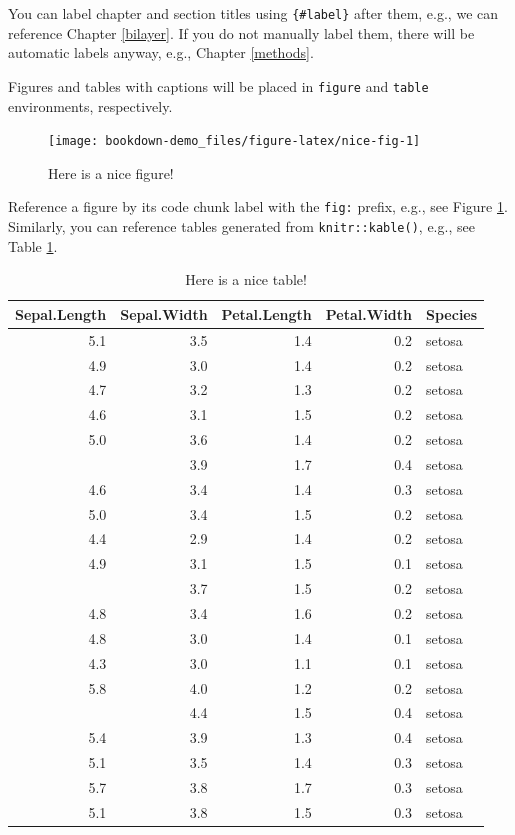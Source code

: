 \documentclass[]{book}
\begin{document}
You can label chapter and section titles using \texttt{\{\#label\}}
after them, e.g., we can reference Chapter \ref{bilayer}. If you do not
manually label them, there will be automatic labels anyway, e.g.,
Chapter \ref{methods}.

Figures and tables with captions will be placed in \texttt{figure} and
\texttt{table} environments, respectively.

\begin{figure}

{\centering \texttt{[image: bookdown-demo\_files/figure-latex/nice-fig-1]} 

}

\caption{Here is a nice figure!}\label{fig:nice-fig}
\end{figure}

Reference a figure by its code chunk label with the \texttt{fig:}
prefix, e.g., see Figure \ref{fig:nice-fig}. Similarly, you can
reference tables generated from \texttt{knitr::kable()}, e.g., see Table
\ref{tab:nice-tab}.

\begin{table}[t]

\caption{\label{tab:nice-tab}Here is a nice table!}
\centering
\begin{tabular}{rrrrl}
\toprule
Sepal.Length & Sepal.Width & Petal.Length & Petal.Width & Species\\
\midrule
5.1 & 3.5 & 1.4 & 0.2 & setosa\\
4.9 & 3.0 & 1.4 & 0.2 & setosa\\
4.7 & 3.2 & 1.3 & 0.2 & setosa\\
4.6 & 3.1 & 1.5 & 0.2 & setosa\\
5.0 & 3.6 & 1.4 & 0.2 & setosa\\
\addlinespace
5.4 & 3.9 & 1.7 & 0.4 & setosa\\
4.6 & 3.4 & 1.4 & 0.3 & setosa\\
5.0 & 3.4 & 1.5 & 0.2 & setosa\\
4.4 & 2.9 & 1.4 & 0.2 & setosa\\
4.9 & 3.1 & 1.5 & 0.1 & setosa\\
\addlinespace
5.4 & 3.7 & 1.5 & 0.2 & setosa\\
4.8 & 3.4 & 1.6 & 0.2 & setosa\\
4.8 & 3.0 & 1.4 & 0.1 & setosa\\
4.3 & 3.0 & 1.1 & 0.1 & setosa\\
5.8 & 4.0 & 1.2 & 0.2 & setosa\\
\addlinespace
5.7 & 4.4 & 1.5 & 0.4 & setosa\\
5.4 & 3.9 & 1.3 & 0.4 & setosa\\
5.1 & 3.5 & 1.4 & 0.3 & setosa\\
5.7 & 3.8 & 1.7 & 0.3 & setosa\\
5.1 & 3.8 & 1.5 & 0.3 & setosa\\
\bottomrule
\end{tabular}
\end{table}
\end{document}
